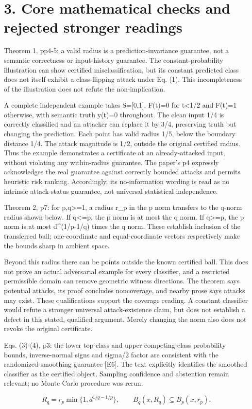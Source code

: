 \documentclass[10pt]{article}
\begin{document}
\section*{3. Core mathematical checks and rejected stronger readings}
Theorem 1, pp4-5: a valid radius is a prediction-invariance guarantee, not a semantic correctness or input-history guarantee. The constant-probability illustration can show certified misclassification, but its constant predicted class does not itself exhibit a class-flipping attack under Eq. (1). This incompleteness of the illustration does not refute the non-implication.\par
A complete independent example takes S=[0,1], F(t)=0 for t<1/2 and F(t)=1 otherwise, with semantic truth y(t)=0 throughout. The clean input 1/4 is correctly classified and an attacker can replace it by 3/4, preserving truth but changing the prediction. Each point has valid radius 1/5, below the boundary distance 1/4. The attack magnitude is 1/2, outside the original certified radius. Thus the example demonstrates a certificate at an already-attacked input, without violating any within-radius guarantee. The paper’s p4 expressly acknowledges the real guarantee against correctly bounded attacks and permits heuristic risk ranking. Accordingly, its no-information wording is read as no intrinsic attack-status guarantee, not universal statistical independence.\par
Theorem 2, p7: for p,q>=1, a radius r\_p in the p norm transfers to the q-norm radius shown below. If q<=p, the p norm is at most the q norm. If q>=p, the p norm is at most d\textasciicircum{}(1/p-1/q) times the q norm. These establish inclusion of the transferred ball; one-coordinate and equal-coordinate vectors respectively make the bounds sharp in ambient space.\par
Beyond this radius there can be points outside the known certified ball. This does not prove an actual adversarial example for every classifier, and a restricted permissible domain can remove geometric witness directions. The theorem says potential attacks, its proof concludes noncoverage, and nearby prose says attacks may exist. These qualifications support the coverage reading. A constant classifier would refute a stronger universal attack-existence claim, but does not establish a defect in this stated, qualified argument. Merely changing the norm also does not revoke the original certificate.\par
Eqs. (3)-(4), p3: the lower top-class and upper competing-class probability bounds, inverse-normal signs and sigma/2 factor are consistent with the randomized-smoothing guarantee [E6]. The text explicitly identifies the smoothed classifier as the certified object. Sampling confidence and abstention remain relevant; no Monte Carlo procedure was rerun.\par
\[R_q=r_p\min\{1,d^{1/q-1/p}\},\qquad B_q(x,R_q)\subseteq B_p(x,r_p).\]\par
\end{document}
